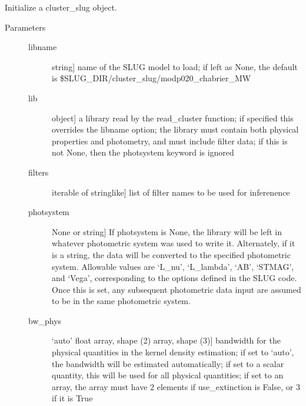 \documentclass[letterpaper,10pt,english]{sphinxmanual}
\begin{document}
\begin{fulllineitems}
\begin{fulllineitems}
\label{\detokenize{cluster_slug:slugpy.cluster_slug.cluster_slug.__init__}}
Initialize a cluster\_slug object.
\begin{description}
\item[{Parameters}] \leavevmode\begin{description}
\item[{libname}] \leavevmode{[}string{]}
name of the SLUG model to load; if left as None, the default
is \$SLUG\_DIR/cluster\_slug/modp020\_chabrier\_MW

\item[{lib}] \leavevmode{[}object{]}
a library read by the read\_cluster function; if specified
this overrides the libname option; the library must
contain both physical properties and photometry, and
must include filter data; if this is not None, then the 
photsystem keyword is ignored

\item[{filters}] \leavevmode{[}iterable of stringlike{]}
list of filter names to be used for inferenence

\item[{photsystem}] \leavevmode{[}None or string{]}
If photsystem is None, the library will be left in
whatever photometric system was used to write
it. Alternately, if it is a string, the data will be
converted to the specified photometric system. Allowable
values are ‘L\_nu’, ‘L\_lambda’, ‘AB’, ‘STMAG’, and
‘Vega’, corresponding to the options defined in the SLUG
code. Once this is set, any subsequent photometric data
input are assumed to be in the same photometric system.

\item[{bw\_phys}] \leavevmode{[}‘auto’ \textbar{} float \textbar{} array, shape (2) \textbar{} array, shape (3){]}
bandwidth for the physical quantities in the kernel
density estimation; if set to ‘auto’, the bandwidth will
be estimated automatically; if set to a scalar quantity,
this will be used for all physical quantities; if set to
an array, the array must have 2 elements if
use\_extinction is False, or 3 if it is True


\end{description}
\end{description}
\end{fulllineitems}
\end{fulllineitems}
\end{document}
